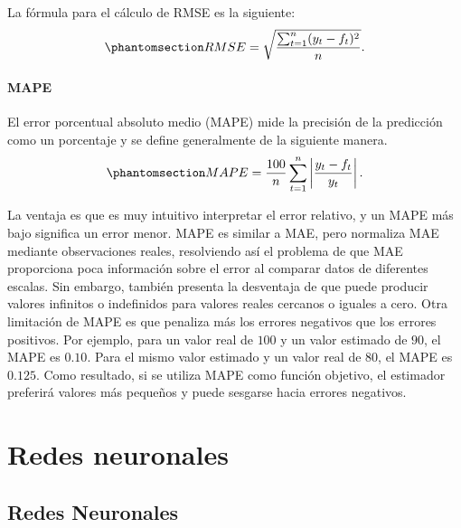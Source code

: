 \documentclass[
  us-letterpaper,
]{scrreprt}
\theoremstyle{plain}
\theoremstyle{definition}
\theoremstyle{definition}
\theoremstyle{plain}
\theoremstyle{remark}
\begin{document}
La fórmula para el cálculo de RMSE es la siguiente:
\begin{equation}\phantomsection\label{eq-RMSE}{RMSE= \sqrt{\frac{\sum_{t=1}^n (y_t-f_t)^2}{n}}.}\end{equation}

\subsection{MAPE}\label{mape}

El error porcentual absoluto medio (MAPE) mide la precisión de la
predicción como un porcentaje y se define generalmente de la siguiente
manera.
\begin{equation}\phantomsection\label{eq-MAPE}{MAPE=\frac{100}{n}\sum_{t=1}^n \left| \frac{y_t-f_t}{y_t}\right|.}\end{equation}

La ventaja es que es muy intuitivo interpretar el error relativo, y un
MAPE más bajo significa un error menor. MAPE es similar a MAE, pero
normaliza MAE mediante observaciones reales, resolviendo así el problema
de que MAE proporciona poca información sobre el error al comparar datos
de diferentes escalas. Sin embargo, también presenta la desventaja de
que puede producir valores infinitos o indefinidos para valores reales
cercanos o iguales a cero. Otra limitación de MAPE es que penaliza más
los errores negativos que los errores positivos. Por ejemplo, para un
valor real de \(100\) y un valor estimado de \(90\), el MAPE es
\(0.10\). Para el mismo valor estimado y un valor real de \(80\), el
MAPE es \(0.125\). Como resultado, si se utiliza MAPE como función
objetivo, el estimador preferirá valores más pequeños y puede sesgarse
hacia errores negativos.

\part{Redes neuronales}

\chapter{Redes Neuronales}\label{redes-neuronales-1}
\end{document}

